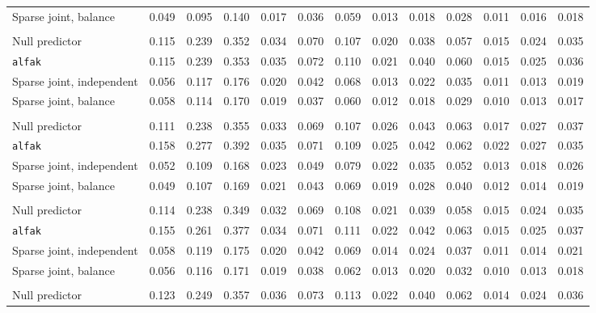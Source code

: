 \begin{center}
\begin{tabular}{l*{12}{r}}
\quad Sparse joint, balance & 0.049 & 0.095 & 0.140 & 0.017 & 0.036 & 0.059 & 0.013 & 0.018 & 0.028 & 0.011 & 0.016 & 0.018 \\
\addlinespace[2pt]
\multicolumn{13}{l}{\textit{500/700, 360 d}} \\
\quad Null predictor & 0.115 & 0.239 & 0.352 & 0.034 & 0.070 & 0.107 & 0.020 & 0.038 & 0.057 & 0.015 & 0.024 & 0.035 \\
\quad \texttt{alfak} & 0.115 & 0.239 & 0.353 & 0.035 & 0.072 & 0.110 & 0.021 & 0.040 & 0.060 & 0.015 & 0.025 & 0.036 \\
\quad Sparse joint, independent & 0.056 & 0.117 & 0.176 & 0.020 & 0.042 & 0.068 & 0.013 & 0.022 & 0.035 & 0.011 & 0.013 & 0.019 \\
\quad Sparse joint, balance & 0.058 & 0.114 & 0.170 & 0.019 & 0.037 & 0.060 & 0.012 & 0.018 & 0.029 & 0.010 & 0.013 & 0.017 \\
\addlinespace[2pt]
\multicolumn{13}{l}{\textit{500/700, 1080 d}} \\
\quad Null predictor & 0.111 & 0.238 & 0.355 & 0.033 & 0.069 & 0.107 & 0.026 & 0.043 & 0.063 & 0.017 & 0.027 & 0.037 \\
\quad \texttt{alfak} & 0.158 & 0.277 & 0.392 & 0.035 & 0.071 & 0.109 & 0.025 & 0.042 & 0.062 & 0.022 & 0.027 & 0.035 \\
\quad Sparse joint, independent & 0.052 & 0.109 & 0.168 & 0.023 & 0.049 & 0.079 & 0.022 & 0.035 & 0.052 & 0.013 & 0.018 & 0.026 \\
\quad Sparse joint, balance & 0.049 & 0.107 & 0.169 & 0.021 & 0.043 & 0.069 & 0.019 & 0.028 & 0.040 & 0.012 & 0.014 & 0.019 \\
\addlinespace[2pt]
\multicolumn{13}{l}{\textit{500/700, bottleneck}} \\
\quad Null predictor & 0.114 & 0.238 & 0.349 & 0.032 & 0.069 & 0.108 & 0.021 & 0.039 & 0.058 & 0.015 & 0.024 & 0.035 \\
\quad \texttt{alfak} & 0.155 & 0.261 & 0.377 & 0.034 & 0.071 & 0.111 & 0.022 & 0.042 & 0.063 & 0.015 & 0.025 & 0.037 \\
\quad Sparse joint, independent & 0.058 & 0.119 & 0.175 & 0.020 & 0.042 & 0.069 & 0.014 & 0.024 & 0.037 & 0.011 & 0.014 & 0.021 \\
\quad Sparse joint, balance & 0.056 & 0.116 & 0.171 & 0.019 & 0.038 & 0.062 & 0.013 & 0.020 & 0.032 & 0.010 & 0.013 & 0.018 \\
\addlinespace[2pt]
\multicolumn{13}{l}{\textit{100/3000, 360 d}} \\
\quad Null predictor & 0.123 & 0.249 & 0.357 & 0.036 & 0.073 & 0.113 & 0.022 & 0.040 & 0.062 & 0.014 & 0.024 & 0.036 \\

\end{tabular}
\end{center}
